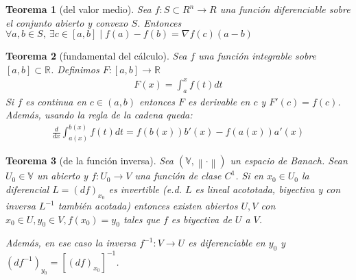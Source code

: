 \documentclass[a4paper,twocolumn]{extarticle}
\newcommand{\R}{\mathbb{R}}
\newcommand{\V}{\mathbb{V}}
\newcommand{\norma}[1]{\left\lVert#1\right\rVert}
\newtheorem*{thm}{Teorema}
\begin{document}
\begin{thm}[del valor medio]
	Sea $f: S \subset R^n \to R$ una función diferenciable sobre el conjunto abierto y convexo $S$. Entonces $\forall a, b \in S,\ \exists c \in [a,b] \mid f(a) - f(b) = \nabla f(c)(a - b)$
\end{thm}

\begin{thm}[fundamental del cálculo]
	Sea $f$ una función integrable sobre $[a,b] \subset \R$. Definimos $F:[a,b] \to \R$
	\begin{align*}
		F(x) = \int_{a}^{x} f(t)dt
	\end{align*}
	Si $f$ es continua en $c \in (a,b)$ entonces $F$ es derivable en $c$ y $F'(c) = f(c)$. Además, usando la regla de la cadena queda:
	\begin{align*}
		\frac{d}{dx}\int_{a(x)}^{b(x)} f(t)dt = f(b(x))b'(x) - f(a(x))a'(x)
	\end{align*}
\end{thm}

\begin{thm}[de la función inversa]
	Sea $(\V, \norma{\cdot})$ un espacio de Banach. Sean $U_0 \in \V$ un abierto y $f:U_0 \to V$ una función de clase $C^1$. Si en $x_0 \in U_0$ la diferencial $L = (df)_{x_0}$ es invertible (e.d. $L$ es lineal acototada, biyectiva y con inversa $L^{-1}$ también acotada) entonces existen abiertos $U, V$ con $x_0 \in U, y_0 \in V, f(x_0) = y_0$  tales que $f$ es biyectiva de $U$ a $V$.
	
	Además, en ese caso la inversa $f^{-1}:V \to U$ es diferenciable en $y_0$ y $(df^{-1})_{y_0} = [(df)_{x_0}]^{-1}$.
\end{thm}
\end{document}
